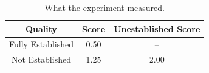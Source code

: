 \begin{table}[htbp]
\centering
\caption{What the experiment measured.}
\begin{tabular}{ccc}
\toprule
\textbf{Quality} & \textbf{Score} & \textbf{Unestablished Score} \\
\midrule
Fully Established & 0.50 & -- \\
Not Established & 1.25 & 2.00 \\
\bottomrule
\end{tabular}
\end{table}
